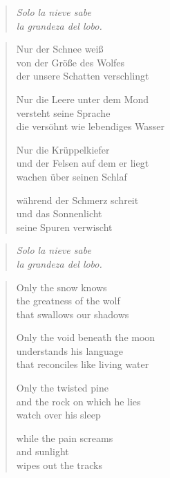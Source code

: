 
\cleartoverso


\begin{quote}
\itshape\smaller
Solo la nieve sabe\\
la grandeza del lobo.

\end{quote}

\begin{verse}
Nur der Schnee weiß\\
von der Größe des Wolfes\\
der unsere Schatten verschlingt

Nur die Leere unter dem Mond\\
versteht seine Sprache\\
die versöhnt wie lebendiges Wasser

Nur die Krüppelkiefer\\
und der Felsen auf dem er liegt\\
wachen über seinen Schlaf

während der Schmerz schreit\\
und das Sonnenlicht\\
seine Spuren verwischt
\end{verse}

\cleartorecto


\begin{quote}
\itshape\smaller
Solo la nieve sabe\\
la grandeza del lobo.

\end{quote}

\begin{verse}
Only the snow knows\\
the greatness of the wolf\\
that swallows our shadows

Only the void beneath the moon\\
understands his language\\
that reconciles like living water

Only the twisted pine\\
and the rock on which he lies\\
watch over his sleep

while the pain screams\\
and sunlight\\
wipes out the tracks
\end{verse}
